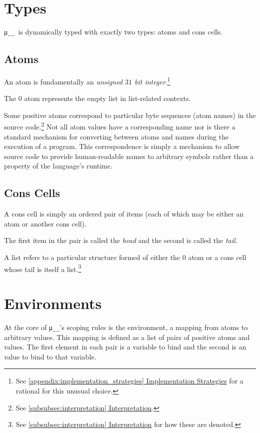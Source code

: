 \documentclass[twocolumn]{report}
\newcommand\muu{\texttt{μ\!\!\!\_\_}}
\newcommand{\intralink}[2]{\hyperref[#1]{\ref*{#1} #2}}
\begin{document}
\section{Types}
\label{sec:types}

\muu \ is dynamically typed with exactly two types: atoms and cons cells.

\subsection{Atoms}
\label{subsec:atoms}

An atom is fundamentally an \emph{unsigned $31$ bit integer}.\footnote{See \intralink{appendix:implementation_strategies}{Implementation Strategies} for a rational for this unusual choice.}

The $0$ atom represents the empty list in list-related contexts.

Some positive atoms correspond to particular byte sequences (atom names) in the source code.\footnote{See \intralink{subsubsec:interpretation}{Interpretation}.}
Not all atom values have a corresponding name nor is there a standard mechanism for converting between atoms and names during the execution of a program. This correspondence is simply a mechanism to allow source code to provide human-readable names to arbitrary symbols rather than a property of the language's runtime.

\subsection{Cons Cells}
\label{subsec:cons_cells}

A cons cell is simply an ordered pair of items (each of which may be either an atom or another cons cell).

The first item in the pair is called the \emph{head} and the second is called the \emph{tail}.

A list refers to a particular structure formed of either the $0$ atom or a cons cell whose tail is itself a list.\footnote{See \intralink{subsubsec:interpretation}{Interpretation} for how these are denoted.}

\section{Environments}
\label{sec:environments}

At the core of \muu's scoping rules is the environment, a mapping from atoms to arbitrary values. This mapping is defined as a list of pairs of positive atoms and values. The first element in each pair is a variable to bind and the second is an value to bind to that variable.
\end{document}
